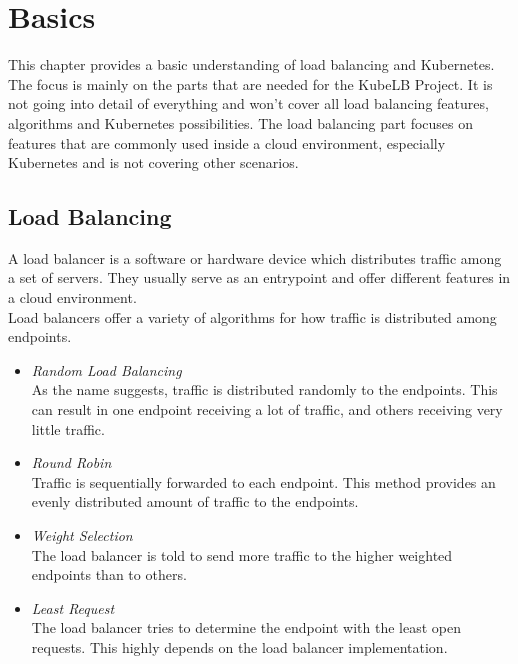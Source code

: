 \chapter{Basics}\label{basics}

This chapter provides a basic understanding of load balancing and Kubernetes.
The focus is mainly on the parts that are needed for the KubeLB Project.
It is not going into detail of everything and won't cover all load balancing features, algorithms and Kubernetes possibilities.
The load balancing part focuses on features that are commonly used inside a cloud environment, especially Kubernetes and is not covering other scenarios.

\section{Load Balancing}

A load balancer is a software or hardware device which distributes traffic among a set of servers.
They usually serve as an entrypoint and offer different features in a cloud environment.
\\
Load balancers offer a variety of algorithms for how traffic is distributed among endpoints.

\begin{itemize}\label{item:lb-algorithms}
    \item \textit{Random Load Balancing} \\
    As the name suggests, traffic is distributed randomly to the endpoints.
    This can result in one endpoint receiving a lot of traffic, and others receiving very little traffic.
    \item \textit{Round Robin} \\
    Traffic is sequentially forwarded to each endpoint.
    This method provides an evenly distributed amount of traffic to the endpoints.
    \item \textit{Weight Selection} \\
    The load balancer is told to send more traffic to the higher weighted endpoints than to others.
    \item \textit{Least Request} \\
    The load balancer tries to determine the endpoint with the least open requests.
    This highly depends on the load balancer implementation.
\end{itemize}

